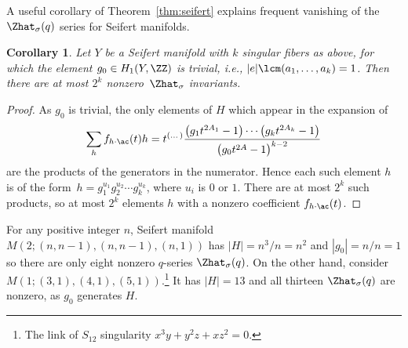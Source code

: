 \documentclass[10pt,a4paper]{amsart}
\newtheorem{Corollary}[Theorem]{Corollary}
\begin{document}
A useful corollary of Theorem~\ref{thm:seifert} explains frequent vanishing of the $\Zhat_{\sigma}(q)$ series for Seifert manifolds.

\begin{Corollary}\label{cor:vanishing}
	Let $Y$ be a Seifert manifold with $k$ singular fibers as above, for which the element $g_0 \in H_1(Y,\ZZ)$ is trivial, i.e., $|e| \lcm(a_1,\dots,a_k) =1$. Then there are at most $2^k$ nonzero~$\Zhat_{\sigma}$ invariants.
\end{Corollary}

\begin{proof}
	As $g_0$ is trivial, the only elements of $H$ which appear in the expansion of
	\begin{equation}\label{seifert_equiv}
		\sum_h f_{h \cdot \ac}(t)h = t^{(\dots)}\frac{ \bigl(g_1 t^{2A_1}-1\bigr)\cdots\bigl(g_k t^{2A_k}-1\bigr)}{\bigl(g_0t^{2A}-1\bigr)^{k-2}}
	\end{equation}
	are the products of the generators in the numerator. Hence each such element $h$ is of the form~${
		h = g_1^{u_1} g_2^{u_2} \cdots g_k^{u_k}}$,
	where $u_i$ is $0$ or $1$. There are at most $2^k$ such products, so at most $2^k$ elements $h$ with a nonzero coefficient $f_{h \cdot \ac}(t)$.
\end{proof}

\begin{Example}
	For any positive integer $n$, Seifert manifold $M(2;(n, n-1), (n, n-1), (n, 1))$ has $|H| = n^3/n = n^2$ and $|g_0| = n/n = 1$ so there are only eight nonzero $q$-series $\Zhat_{\sigma} (q)$.
	On the other hand, consider $M(1;(3, 1), (4, 1), (5, 1))$.\footnote{The link of $S_{12}$ singularity $x^3y+y^2z+xz^2 = 0$.} It has $|H| = 13$ and all thirteen $\Zhat_{\sigma} (q)$ are nonzero, as $g_0$ generates $H$.
\end{Example}
\end{document}
